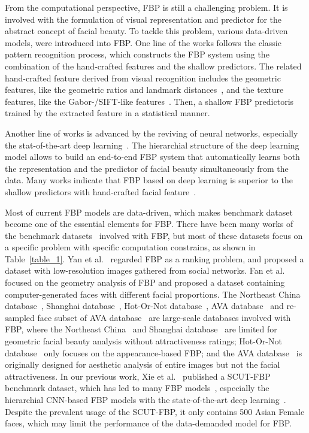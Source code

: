 \documentclass[10pt,conference,a4paper]{IEEEtran}
\begin{document}
From the computational perspective, FBP is still a challenging problem. It is involved with the formulation of visual representation and predictor for the abstract concept of facial beauty. To tackle this problem, various data-driven models, were introduced into FBP. One line of the works follows the classic pattern recognition process, which constructs the FBP system using  the combination of the hand-crafted features and the shallow predictors. The related hand-crafted feature derived from visual recognition includes the geometric features, like the geometric ratios and landmark distances~\cite{2011survey,2009mao,2006nc_Dror,2006Kagian,2012fan,2011zhang}, and the texture features, like the Gabor-/SIFT-like features~\cite{2013wacv,2010jin,2014yan}. Then, a shallow FBP predictoris trained by the extracted feature in a statistical manner.

Another line of works is advanced by the reviving of neural networks, especially the stat-of-the-art deep learning~\cite{2015nature}. The hierarchial structure of the deep learning model allows to build an end-to-end FBP system that automatically learns both the representation and the predictor of facial beauty simultaneously from the data. Many works
indicate that FBP based on deep learning is superior to the shallow predictors with hand-crafted facial feature~\cite{2014wang,2014gan,2010gray,xu2017facial,2017liang-icip,2015xie}.




Most of current FBP models are data-driven, which makes benchmark dataset become one of the essential elements for FBP. There have been many works of the benchmark datasets~\cite{2012fan,2014yan,17,2014wang,2010gray,4,2012ava,14} involved with FBP, but most of these datasets focus on a specific problem with specific computation constrains, as shown in Table~\ref{table_1}. Yan et al.~\cite{2014yan} regarded FBP as a ranking problem, and proposed a dataset with low-resolution images gathered from social networks. Fan et al.~\cite{2012fan} focused on the geometry analysis of FBP and proposed a dataset containing computer-generated faces with different facial proportions. The Northeast China database~\cite{4}, Shanghai database~\cite{2011zhang}, Hot-Or-Not database~\cite{white2004automatic,2010gray}, AVA database~\cite{2012ava} and re-sampled face subset of AVA database~\cite{14} are large-scale databases involved with FBP, where the Northeast China~\cite{4} and Shanghai database~\cite{2011zhang} are limited for geometric facial beauty analysis without attractiveness ratings; Hot-Or-Not database~\cite{white2004automatic,2010gray} only focuses on the appearance-based FBP; and the AVA database~\cite{2012ava,14} is originally designed for aesthetic analysis of entire images but not the facial attractiveness. In our previous work, Xie et al.~\cite{2015xie} published a SCUT-FBP benchmark dataset, which has led to many FBP models~\cite{2015xie,xu2017facial,2017liang-icip,Ren2017sense,liu2016dis}, especially the hierarchial CNN-based FBP models with the state-of-the-art deep learning~\cite{2015xie,xu2017facial,2017liang-icip,liu2016dis}. Despite the prevalent usage of the SCUT-FBP, it only contains 500 Asian Female faces, which may limit the performance of the data-demanded model for FBP. 
\end{document}
